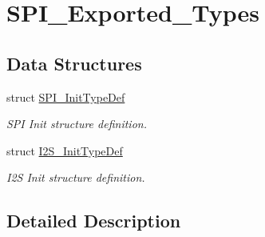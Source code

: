 \hypertarget{group___s_p_i___exported___types}{}\section{S\+P\+I\+\_\+\+Exported\+\_\+\+Types}
\label{group___s_p_i___exported___types}
\subsection*{Data Structures}
\begin{DoxyCompactItemize}
\item 
struct \mbox{\hyperlink{struct_s_p_i___init_type_def}{S\+P\+I\+\_\+\+Init\+Type\+Def}}
\begin{DoxyCompactList}\small\item\em S\+PI Init structure definition. \end{DoxyCompactList}\item 
struct \mbox{\hyperlink{struct_i2_s___init_type_def}{I2\+S\+\_\+\+Init\+Type\+Def}}
\begin{DoxyCompactList}\small\item\em I2S Init structure definition. \end{DoxyCompactList}\end{DoxyCompactItemize}


\subsection{Detailed Description}
